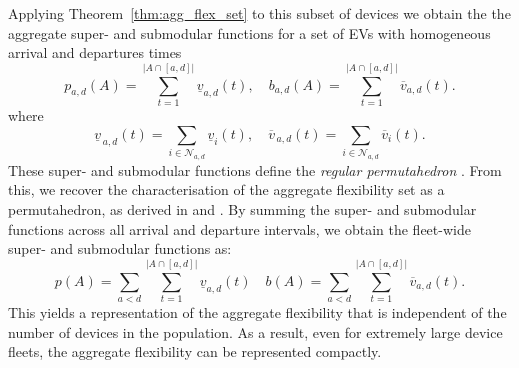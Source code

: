 Applying Theorem~\ref{thm:agg_flex_set} to this subset of devices we obtain the the aggregate super- and submodular functions for a set of EVs with homogeneous arrival and departures times
\begin{equation*}
  p_{a,d}(A) = \sum_{t=1}^{\lvert A\cap [a,d]|} \underline v_{a,d}(t),
  \quad
  b_{a,d}(A) = \sum_{t=1}^{\lvert A\cap [a,d]|} \overline v_{a,d}(t).
\end{equation*}
where
\[
  \underline v_{\,a,d}(t) = \sum_{i\in\mathcal{N}_{a,d}} \underline v_i(t),
  \quad
  \overline v_{\,a,d}(t)=\sum_{i\in\mathcal{N}_{a,d}} \overline v_i(t).
\]
These super- and submodular functions define the \textit{regular permutahedron} \cite{Postnikov2009PermutohedraBeyond}. From this, we recover the characterisation of the aggregate flexibility set as a permutahedron, as derived in \cite{Mukhi2023AnVehicles} and \cite{Panda2024EfficientVehicles}. By summing the super- and submodular functions across all arrival and departure intervals, we obtain the fleet-wide super- and submodular functions as:
\begin{equation*}\label{eq:V1G_aggregate_permutahedra}
    p(A) = \sum_{a < d}\sum_{t=1}^{\lvert A\cap [a,d]|} \underline v_{a,d}(t)
    \quad
    b(A) = \sum_{a < d}\sum_{t=1}^{\lvert A\cap [a,d]|} \overline v_{a,d}(t).
\end{equation*}
This yields a representation of the  aggregate flexibility that is independent of the number of devices in the population. As a result, even for extremely large device fleets, the aggregate flexibility can be represented compactly.
